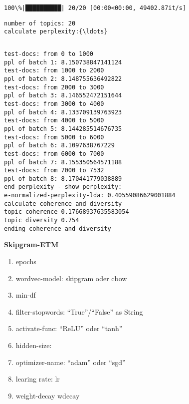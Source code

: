\documentclass[11pt]{article}
\providecommand{\tightlist}{%
      \setlength{\itemsep}{0pt}\setlength{\parskip}{0pt}}
\begin{document}
    \begin{Verbatim}[commandchars=\\\{\}]
100\%|██████████| 20/20 [00:00<00:00, 49402.87it/s]\end{Verbatim}

    \begin{Verbatim}[commandchars=\\\{\}]
number of topics: 20
calculate perplexity:{\ldots}
\end{Verbatim}

    \begin{Verbatim}[commandchars=\\\{\}]

\end{Verbatim}

    \begin{Verbatim}[commandchars=\\\{\}]
test-docs: from 0 to 1000
ppl of batch 1: 8.150738847141124
test-docs: from 1000 to 2000
ppl of batch 2: 8.148755636492822
test-docs: from 2000 to 3000
ppl of batch 3: 8.146552472151644
test-docs: from 3000 to 4000
ppl of batch 4: 8.133709139763923
test-docs: from 4000 to 5000
ppl of batch 5: 8.144285514676735
test-docs: from 5000 to 6000
ppl of batch 6: 8.1097638767229
test-docs: from 6000 to 7000
ppl of batch 7: 8.155350564571188
test-docs: from 7000 to 7532
ppl of batch 8: 8.170441779038889
end perplexity - show perplexity:
e-normalized-perplexity-lda: 0.40559086629001884
calculate coherence and diversity
topic coherence 0.17668937635583054
topic diversity 0.754
ending coherence and diversity
\end{Verbatim}

    \textbf{Skipgram-ETM}

\begin{enumerate}
\def\labelenumi{\arabic{enumi}.}
\tightlist
\item
  epochs
\item
  wordvec-model: skipgram oder cbow
\item
  min-df
\item
  filter-stopwords: ``True''/``False'' as String
\item
  activate-func: ``ReLU'' oder ``tanh''
\item
  hidden-size:
\item
  optimizer-name: ``adam'' oder ``sgd''
\item
  learing rate: lr
\item
  weight-decay wdecay
\end{enumerate}
\end{document}
